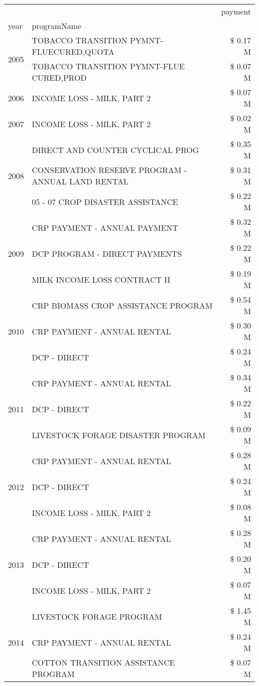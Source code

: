 \begin{tabular}{llr}
\toprule
 &  & payment \\
year & programName &  \\
\midrule
\multirow[t]{2}{*}{2005} & TOBACCO TRANSITION PYMNT-FLUECURED,QUOTA & \$ 0.17 M \\
 & TOBACCO TRANSITION PYMNT-FLUE CURED,PROD & \$ 0.07 M \\
\cline{1-3}
2006 & INCOME LOSS - MILK, PART 2 & \$ 0.07 M \\
\cline{1-3}
2007 & INCOME LOSS - MILK, PART 2 & \$ 0.02 M \\
\cline{1-3}
\multirow[t]{3}{*}{2008} & DIRECT AND COUNTER CYCLICAL PROG & \$ 0.35 M \\
 & CONSERVATION RESERVE PROGRAM - ANNUAL LAND RENTAL & \$ 0.31 M \\
 & 05 - 07 CROP DISASTER ASSISTANCE & \$ 0.22 M \\
\cline{1-3}
\multirow[t]{3}{*}{2009} & CRP PAYMENT - ANNUAL PAYMENT & \$ 0.32 M \\
 & DCP PROGRAM - DIRECT PAYMENTS & \$ 0.22 M \\
 & MILK INCOME LOSS CONTRACT II & \$ 0.19 M \\
\cline{1-3}
\multirow[t]{3}{*}{2010} & CRP BIOMASS CROP ASSISTANCE PROGRAM & \$ 0.54 M \\
 & CRP PAYMENT - ANNUAL RENTAL & \$ 0.30 M \\
 & DCP - DIRECT & \$ 0.24 M \\
\cline{1-3}
\multirow[t]{3}{*}{2011} & CRP PAYMENT - ANNUAL RENTAL & \$ 0.34 M \\
 & DCP - DIRECT & \$ 0.22 M \\
 & LIVESTOCK FORAGE DISASTER PROGRAM & \$ 0.09 M \\
\cline{1-3}
\multirow[t]{3}{*}{2012} & CRP PAYMENT - ANNUAL RENTAL & \$ 0.28 M \\
 & DCP - DIRECT & \$ 0.24 M \\
 & INCOME LOSS - MILK, PART 2 & \$ 0.08 M \\
\cline{1-3}
\multirow[t]{3}{*}{2013} & CRP PAYMENT - ANNUAL RENTAL & \$ 0.28 M \\
 & DCP - DIRECT & \$ 0.20 M \\
 & INCOME LOSS - MILK, PART 2 & \$ 0.07 M \\
\cline{1-3}
\multirow[t]{3}{*}{2014} & LIVESTOCK FORAGE PROGRAM & \$ 1.45 M \\
 & CRP PAYMENT - ANNUAL RENTAL & \$ 0.24 M \\
 & COTTON TRANSITION ASSISTANCE PROGRAM & \$ 0.07 M \\

\end{tabular}
